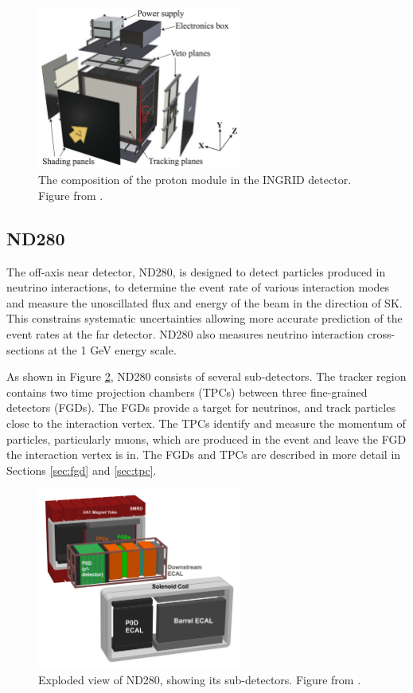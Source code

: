 \begin{figure}
\centering
\includegraphics*[width=0.6\textwidth,clip]{figs/protonmodule}
\caption{The composition of the proton module in the INGRID detector. Figure from \cite{tript}.} \label{protonmodule}
\end{figure}

\subsection{ND280}\label{sec:nd280}

The off-axis near detector, ND280, is designed to detect particles produced in neutrino interactions, to determine the event rate of various interaction modes and measure the unoscillated flux and energy of the beam in the direction of SK. This constrains systematic uncertainties allowing more accurate prediction of the event rates at the far detector. ND280 also measures neutrino interaction cross-sections at the 1 GeV energy scale. 

As shown in Figure \ref{nd280basket}, ND280 consists of several sub-detectors. The tracker region contains two time projection chambers (TPCs) between three fine-grained detectors (FGDs). The FGDs provide a target for neutrinos, and track particles close to the interaction vertex. The TPCs identify and measure the momentum of particles, particularly muons, which are produced in the event and leave the FGD the interaction vertex is in. The FGDs and TPCs are described in more detail in Sections \ref{sec:fgd} and \ref{sec:tpc}.

\begin{figure}
\centering
\includegraphics*[width=0.6\textwidth,clip]{figs/nd280basket}
\caption{Exploded view of ND280, showing its sub-detectors. Figure from \cite{tript}.} \label{nd280basket}
\end{figure}

